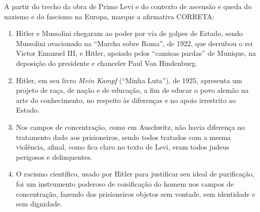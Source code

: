 A partir do trecho da obra de Primo Levi e do contexto de ascensão e queda do nazismo e do fascismo na Europa, marque a afirmativa CORRETA:\begin{enumerate}
\item Hitler e Mussolini chegaram ao poder por via de golpes de Estado, sendo Mussolini ovacionado na “Marcha
        sobre Roma”, de 1922, que derrubou o rei Victor Emanuel III, e Hitler, apoiado pelos “camisas pardas” de
        Munique, na deposição do presidente e chanceler Paul Von Hindenburg.
\item Hitler, em seu livro \textit{Mein Kampf} (“Minha Luta”), de 1925, apresenta um projeto de raça, de nação e de
        educação, a fim de educar o povo alemão na arte do conhecimento, no respeito às diferenças e no apoio
        irrestrito ao Estado.
\item Nos campos de concentração, como em Auschwitz, não havia diferença no tratamento dado aos
        prisioneiros, sendo todos tratados com a mesma violência, afinal, como fica claro no texto de Levi, eram
        todos judeus perigosos e delinquentes.
\item O racismo científico, usado por Hitler para justificar seu ideal de purificação, foi um instrumento poderoso
        de coisificação do homem nos campos de concentração, fazendo dos prisioneiros objetos sem vontade,
        sem identidade e sem dignidade.\end{enumerate}
